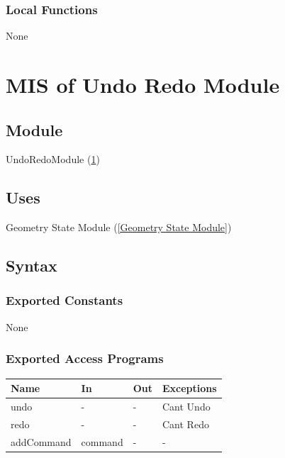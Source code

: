 \documentclass[12pt, titlepage]{article}
\begin{document}
%

\subsubsection{Local Functions}
None

\newpage
\section{MIS of {Undo Redo Module}} \label{Undo Redo Module}
%
%

\subsection{Module}
UndoRedoModule (\ref{Undo Redo Module})

\subsection{Uses}
{Geometry State Module} (\ref{Geometry State Module})
\subsection{Syntax}

\subsubsection{Exported Constants}
None
\subsubsection{Exported Access Programs}

\begin{center}
\begin{tabular}{p{3cm} p{4cm} p{4cm} p{2cm}}
\hline
\textbf{Name} & \textbf{In} & \textbf{Out} & \textbf{Exceptions} \\
\hline
{undo} & - & - & Cant Undo \\
\hline
{redo} & - & - & Cant Redo \\
\hline
{addCommand} & command & - & - \\
\hline
\end{tabular}
\end{center}
\end{document}
